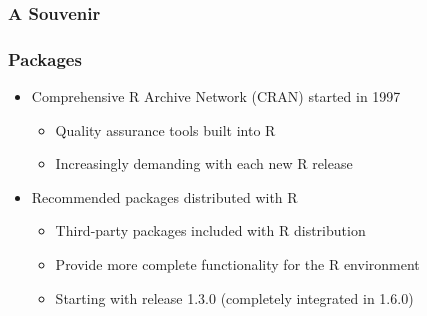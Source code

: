 \documentclass[svgnames, aspectratio=169]{beamer}
\begin{document}
\begin{frame}
  \frametitle{A Souvenir}

  \centering

\end{frame}

\begin{frame}
  \frametitle{Packages}

  \begin{itemize}
  \item Comprehensive R Archive Network (CRAN) started in 1997
    \begin{itemize}
    \item Quality assurance tools built into R
    \item Increasingly demanding with each new R release
    \end{itemize}
  \item Recommended packages distributed with R
    \begin{itemize}
    \item Third-party packages included with R distribution
    \item Provide more complete functionality for the R environment
    \item Starting with release 1.3.0 (completely integrated in 1.6.0)
    \end{itemize}
  \end{itemize}
  
\end{frame}
\end{document}
